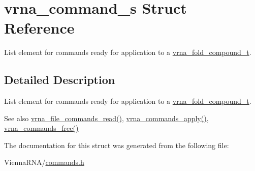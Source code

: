 \hypertarget{structvrna__command__s}{}\section{vrna\+\_\+command\+\_\+s Struct Reference}
\label{structvrna__command__s}


List element for commands ready for application to a \mbox{\hyperlink{group__fold__compound_ga1b0cef17fd40466cef5968eaeeff6166}{vrna\+\_\+fold\+\_\+compound\+\_\+t}}.  




\subsection{Detailed Description}
List element for commands ready for application to a \mbox{\hyperlink{group__fold__compound_ga1b0cef17fd40466cef5968eaeeff6166}{vrna\+\_\+fold\+\_\+compound\+\_\+t}}. 

\begin{DoxySeeAlso}{See also}
\mbox{\hyperlink{commands_8h_a5d2a64331cff5b1059e7d327545d8a63}{vrna\+\_\+file\+\_\+commands\+\_\+read()}}, \mbox{\hyperlink{commands_8h_a5e993fc4b9602af73aaaab4d3b3cd9a9}{vrna\+\_\+commands\+\_\+apply()}}, \mbox{\hyperlink{commands_8h_a926fd7632e68f3da2e2069402b80b1ab}{vrna\+\_\+commands\+\_\+free()}} 
\end{DoxySeeAlso}


The documentation for this struct was generated from the following file\+:\begin{DoxyCompactItemize}
\item 
Vienna\+R\+N\+A/\mbox{\hyperlink{commands_8h}{commands.\+h}}\end{DoxyCompactItemize}
